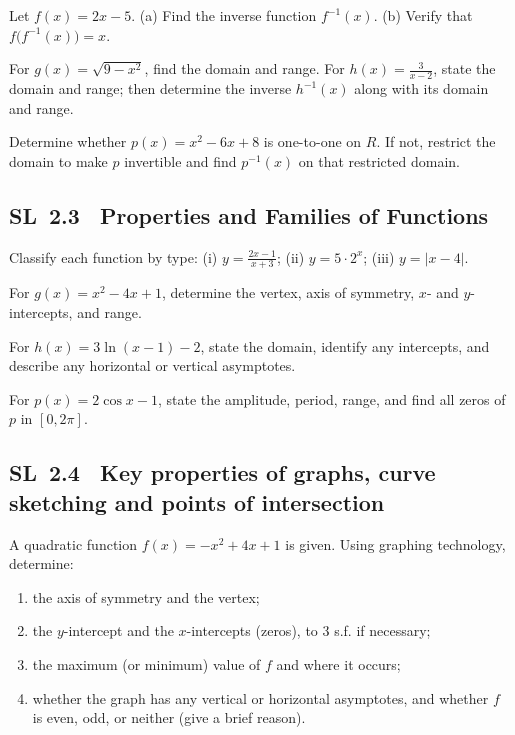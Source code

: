 \documentclass[11pt]{article}
\def\mathbb#1{#1}%
\newcommand{\tocsubsection}[1]{\subsection{#1}}
\newcounter{question}
\begin{document}
\begin{question}
Let $f(x)=2x-5$.  (a) Find the inverse function $f^{-1}(x)$.  (b) Verify that
$f\bigl(f^{-1}(x)\bigr)=x$.
\end{question}

\begin{question}
For $g(x)=\sqrt{9-x^2}$, find the domain and range.  For $h(x)=\frac{3}{x-2}$,
state the domain and range; then determine the inverse $h^{-1}(x)$ along with
its domain and range.
\end{question}

\begin{question}
Determine whether $p(x)=x^2-6x+8$ is one-to-one on $\mathbb{R}$.  If not,
restrict the domain to make $p$ invertible and find $p^{-1}(x)$ on that
restricted domain.
\end{question}

\tocsubsection{SL 2.3 \; Properties and Families of Functions}

\begin{question}
Classify each function by type: (i) $y=\tfrac{2x-1}{x+3}$; (ii) $y=5\cdot2^x$;
(iii) $y=|x-4|$.
\end{question}

\begin{question}
For $g(x)=x^2-4x+1$, determine the vertex, axis of symmetry, $x$- and
$y$-intercepts, and range.
\end{question}

\begin{question}
For $h(x)=3\ln(x-1)-2$, state the domain, identify any intercepts, and describe
any horizontal or vertical asymptotes.
\end{question}

\begin{question}
For $p(x)=2\cos x-1$, state the amplitude, period, range, and find all zeros of
$p$ in $[0,2\pi]$.
\end{question}





\tocsubsection{SL 2.4 \; Key properties of graphs, curve sketching and points of intersection}

\begin{question}
A quadratic function $f(x)=-x^{2}+4x+1$ is given. Using graphing technology, determine:
\begin{enumerate}
  \item the axis of symmetry and the vertex;
  \item the $y$-intercept and the $x$-intercepts (zeros), to 3 s.f. if necessary;
  \item the maximum (or minimum) value of $f$ and where it occurs;
  \item whether the graph has any vertical or horizontal asymptotes, and whether $f$ is even, odd, or neither (give a brief reason).
\end{enumerate}
\end{question}
\end{document}

